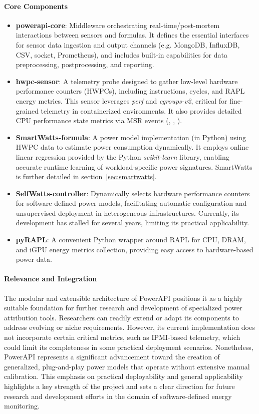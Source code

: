 \paragraph{Core Components}
\begin{itemize}
    \item \textbf{powerapi-core}: Middleware orchestrating real-time/post-mortem interactions between sensors and formulas. It defines the essential interfaces for sensor data ingestion and output channels (e.g. MongoDB, InfluxDB, CSV, socket, Prometheus), and includes built-in capabilities for data preprocessing, postprocessing, and reporting.
    \item \textbf{hwpc-sensor}: A telemetry probe designed to gather low-level hardware performance counters (HWPCs), including instructions, cycles, and RAPL energy metrics. This sensor leverages \textit{perf} and \textit{cgroups-v2}, critical for fine-grained telemetry in containerized environments. It also provides detailed CPU performance state metrics via MSR events (, , ).
    \item \textbf{SmartWatts-formula}\parencite{fieni2020smartwatts}: A power model implementation (in Python) using HWPC data to estimate power consumption dynamically. It employs online linear regression provided by the Python \textit{scikit-learn}\parencite{scikit-learn} library, enabling accurate runtime learning of workload-specific power signatures. SmartWatts is further detailed in section~\ref{sec:smartwatts}.
    \item \textbf{SelfWatts-controller}: Dynamically selects hardware performance counters for software-defined power models, facilitating automatic configuration and unsupervised deployment in heterogeneous infrastructures. Currently, its development has stalled for several years, limiting its practical applicability.
    \item \textbf{pyRAPL}: A convenient Python wrapper around RAPL for CPU, DRAM, and iGPU energy metrics collection, providing easy access to hardware-based power data.
\end{itemize}

\paragraph{Relevance and Integration}
The modular and extensible architecture of PowerAPI positions it as a highly suitable foundation for further research and development of specialized power attribution tools. Researchers can readily extend or adapt its components to address evolving or niche requirements. However, its current implementation does not incorporate certain critical metrics, such as IPMI-based telemetry, which could limit its completeness in some practical deployment scenarios. Nonetheless, PowerAPI represents a significant advancement toward the creation of generalized, plug-and-play power models that operate without extensive manual calibration. This emphasis on practical deployability and general applicability highlights a key strength of the project and sets a clear direction for future research and development efforts in the domain of software-defined energy monitoring.

